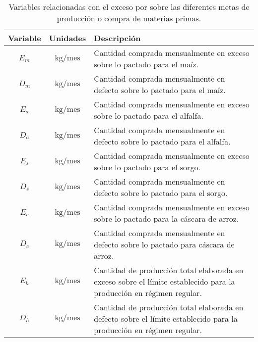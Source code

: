 \documentclass[a4paper,11pt]{article}
\begin{document}
\begin{table}[h!t]
  \centering
  \begin{tabular}{ | c | c | p{7cm} | }
    \hline
    \textbf{Variable} & \textbf{Unidades}          & \textbf{Descripción} \\ \hline
              \(E_m\) & \(\text{kg} / \text{mes}\) & Cantidad comprada mensualmente en exceso sobre lo pactado para el maíz. \\ \hline
              \(D_m\) & \(\text{kg} / \text{mes}\) & Cantidad comprada mensualmente en defecto sobre lo pactado para el maíz. \\ \hline
              \(E_a\) & \(\text{kg} / \text{mes}\) & Cantidad comprada mensualmente en exceso sobre lo pactado para el alfalfa. \\ \hline
              \(D_a\) & \(\text{kg} / \text{mes}\) & Cantidad comprada mensualmente en defecto sobre lo pactado para el alfalfa. \\ \hline
              \(E_s\) & \(\text{kg} / \text{mes}\) & Cantidad comprada mensualmente en exceso sobre lo pactado para el sorgo. \\ \hline
              \(D_s\) & \(\text{kg} / \text{mes}\) & Cantidad comprada mensualmente en defecto sobre lo pactado para el sorgo. \\ \hline
              \(E_c\) & \(\text{kg} / \text{mes}\) & Cantidad comprada mensualmente en exceso sobre lo pactado para la cáscara de arroz. \\ \hline
              \(D_c\) & \(\text{kg} / \text{mes}\) & Cantidad comprada mensualmente en defecto sobre lo pactado para cáscara de arroz. \\ \hline
              \(E_h\) & \(\text{kg} / \text{mes}\) & Cantidad de producción total elaborada en exceso sobre el límite establecido para la producción en régimen regular. \\ \hline
              \(D_h\) & \(\text{kg} / \text{mes}\) & Cantidad de producción total elaborada en defecto sobre el límite establecido para la producción en régimen regular. \\ \hline
  \end{tabular}
  \caption{Variables relacionadas con el exceso por sobre las diferentes metas de producción o compra de materias primas.}
\end{table}
\end{document}
